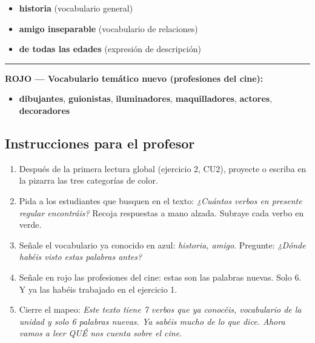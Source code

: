 \documentclass[a4paper,11pt]{article}
\begin{document}
\begin{itemize}[leftmargin=2cm, itemsep=2pt]
\item \textcolor{azulg}{\textbf{historia}} (vocabulario general)
\item \textcolor{azulg}{\textbf{amigo inseparable}} (vocabulario de relaciones)
\item \textcolor{azulg}{\textbf{de todas las edades}} (expresión de descripción)
\end{itemize}

\vspace{0.3cm}

\noindent\textcolor{rojog}{\rule{0.5cm}{0.5cm}}\hspace{0.3cm}\textbf{\textcolor{rojog}{ROJO — Vocabulario temático nuevo (profesiones del cine):}}

\begin{itemize}[leftmargin=2cm, itemsep=2pt]
\item \textcolor{rojog}{\textbf{dibujantes}}, \textcolor{rojog}{\textbf{guionistas}}, \textcolor{rojog}{\textbf{iluminadores}}, \textcolor{rojog}{\textbf{maquilladores}}, \textcolor{rojog}{\textbf{actores}}, \textcolor{rojog}{\textbf{decoradores}}
\end{itemize}

\vspace{0.3cm}

\begin{center}
\end{center}

\vspace{0.5cm}

\subsection*{Instrucciones para el profesor}

\begin{enumerate}[leftmargin=1.5cm, itemsep=4pt]
\item Después de la primera lectura global (ejercicio 2, CU2), proyecte o escriba en la pizarra las tres categorías de color.
\item Pida a los estudiantes que busquen en el texto: \textit{¿Cuántos verbos en presente regular encontráis?} Recoja respuestas a mano alzada. Subraye cada verbo en verde.
\item Señale el vocabulario ya conocido en azul: \textit{historia, amigo}. Pregunte: \textit{¿Dónde habéis visto estas palabras antes?}
\item Señale en rojo las profesiones del cine: estas son las palabras nuevas. Solo 6. Y ya las habéis trabajado en el ejercicio 1.
\item Cierre el mapeo: \textit{Este texto tiene 7 verbos que ya conocéis, vocabulario de la unidad y solo 6 palabras nuevas. Ya sabéis mucho de lo que dice. Ahora vamos a leer QUÉ nos cuenta sobre el cine.}
\end{enumerate}
\end{document}
